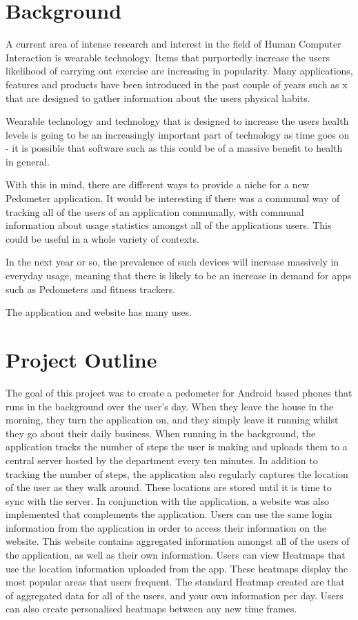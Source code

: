 \documentclass{l4proj}
\begin{document}
\section{Background}

A current area of intense research and interest in the field of Human Computer Interaction is wearable technology. Items that purportedly increase the users likelihood of carrying out exercise are increasing in popularity. Many applications, features and products have been introduced in the past couple of years such as x that are designed to gather information about the users physical habits. 

Wearable technology and technology that is designed to increase the users health levels is going to be an increasingly important part of technology as time goes on - it is possible that software such as this could be of a massive benefit to health in general.

With this in mind, there are different ways to provide a niche for a new Pedometer application. It would be interesting if there was a communal way of tracking all of the users of an application communally, with communal information about usage statistics amongst all of the applications users. This could be useful in a whole variety of contexts.

In the next year or so, the prevalence of such devices will increase massively in everyday usage, meaning that there is likely to be an increase in demand for apps such as Pedometers and fitness trackers. 

The application and website has many uses.

\section{Project Outline}

The goal of this project was to create a pedometer for Android based phones that runs in the background over the user's day. When they leave the house in the morning, they turn the application on, and they simply leave it running whilst they go about their daily business. When running in the background, the application tracks the number of steps the user is making and uploads them to a central server hosted by the department every ten minutes. In addition to tracking the number of steps, the application also regularly captures the location of the user as they walk around. These locations are stored until it is time to sync with the server. In conjunction with the application, a website was also implemented that complements the application. Users can use the same login information from the application in order to access their information on the website. This website contains aggregated information amongst all of the users of the application, as well as their own information. Users can view Heatmaps that use the location information uploaded from the app. These heatmaps display the most popular areas that users frequent. The standard Heatmap created are that of aggregated data for all of the users, and your own information per day. Users can also create personalised heatmaps between any new time frames.
\end{document}
